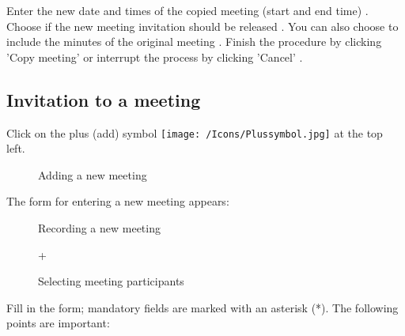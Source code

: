 Enter the new date and times of the copied meeting (start and end time) . Choose if the new meeting invitation should be released . You can also choose to include the minutes of the original meeting . Finish the procedure by clicking 'Copy meeting'  or interrupt the process by clicking 'Cancel' .

\vspace{\baselineskip}



\subsection{Invitation to a meeting}
\label{bkm:Ref434828480}

Click on the plus (add) symbol \texttt{[image: /Icons/Plussymbol.jpg]}  at the top left.

\vspace{\baselineskip}

\begin{figure}[H]
\caption{Adding a new meeting}
\end{figure}


The form for entering a new meeting appears:

\begin{figure}[H]
\caption{Recording a new meeting}
\end{figure}

\begin{figure}[H]
+
\caption{Selecting meeting participants}
\end{figure}

Fill in the form; mandatory fields are marked with an asterisk (*). The following points are important:

